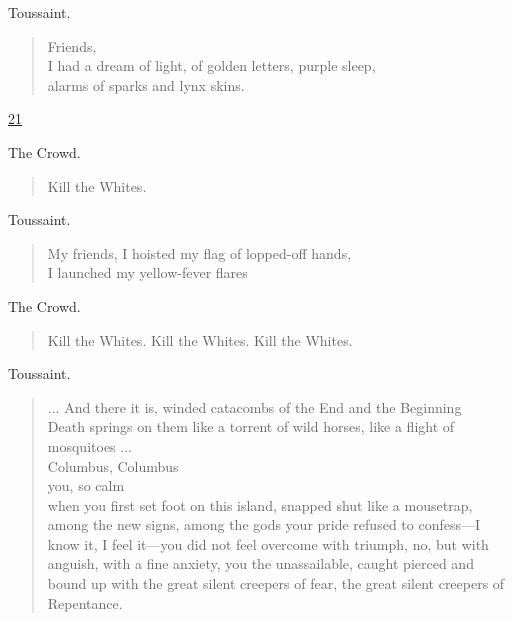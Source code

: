 \documentclass[letterpaper,article,12pt,oneside,notitlepage]{memoir}
\begin{document}
\begin{center}Toussaint.\end{center}

\begin{verse}
\hspace{1cm} Friends, \\
I had a dream of light, of golden letters, purple sleep, \\
alarms of sparks and lynx skins. \\
\end{verse}

\clearpage

\href{http://cesaire.elotroalex.com/chiens/chiens/p021.html}{21}

\begin{center}The Crowd.\end{center}

\begin{verse}
\hspace{1cm} Kill the Whites. \\
\end{verse}

\begin{center}Toussaint.\end{center}

\begin{verse}
\hspace{1cm} My friends, I hoisted my flag of lopped-off hands, \\
I launched my yellow-fever flares \\
\end{verse}

\begin{center}The Crowd.\end{center}

\begin{verse}
\hspace{1cm} Kill the Whites. Kill the Whites. Kill the Whites. \\
\end{verse}

\begin{center}Toussaint.\end{center}

\begin{verse}
\hspace{1cm} ... And there it is, winded catacombs of the End and the Beginning \\
Death springs on them like a torrent of wild horses, like a flight of mosquitoes ... \\
Columbus, Columbus \\
you, so calm \\
when you first set foot on this island, snapped shut like a mousetrap, \\
among the new signs, among the gods your pride refused to confess---I know it, I feel it---you did not feel overcome with triumph, no, but with anguish, with a fine anxiety, you the unassailable, caught pierced and bound up with the great silent creepers of fear, the great silent creepers of Repentance. \\
\end{verse}
\end{document}
